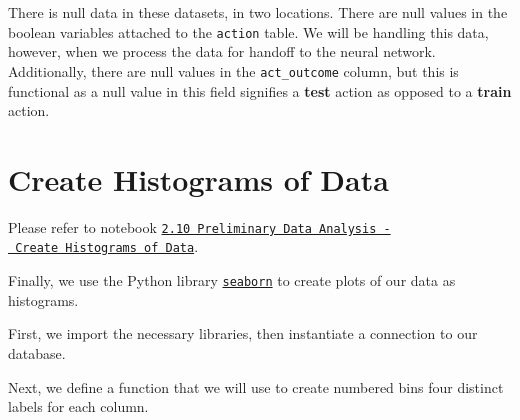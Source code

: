 \documentclass[]{report}
\newenvironment{Shaded}{}{}
\newcommand{\StringTok}[1]{\textcolor[rgb]{0.25,0.44,0.63}{{#1}}}
\newcommand{\ImportTok}[1]{{#1}}
\newcommand{\OperatorTok}[1]{\textcolor[rgb]{0.40,0.40,0.40}{{#1}}}
\newcommand{\ExtensionTok}[1]{{#1}}
\newcommand{\NormalTok}[1]{{#1}}
\begin{document}
There is null data in these datasets, in two locations. There are null
values in the boolean variables attached to the \texttt{action} table.
We will be handling this data, however, when we process the data for
handoff to the neural network. Additionally, there are null values in
the \texttt{act\_outcome} column, but this is functional as a null value
in this field signifies a \textbf{test} action as opposed to a
\textbf{train} action.

\pagebreak

\chapter{Create Histograms of Data}\label{create-histograms-of-data}

Please refer to notebook
\href{http://joshuacook.me:8003/notebooks/ipynb/2.10\%20Preliminary\%20Data\%20Analysis\%20-\%20Create\%20Histograms\%20of\%20Data.ipynb}{\texttt{2.10\ Preliminary\ Data\ Analysis\ -\ Create\ Histograms\ of\ Data}}.

Finally, we use the Python library
\href{https://stanford.edu/~mwaskom/software/seaborn/}{\texttt{seaborn}}
to create plots of our data as histograms.

First, we import the necessary libraries, then instantiate a connection
to our database.

\begin{Shaded}
\end{Shaded}

\pagebreak

Next, we define a function that we will use to create numbered bins four
distinct labels for each column.
\end{document}
